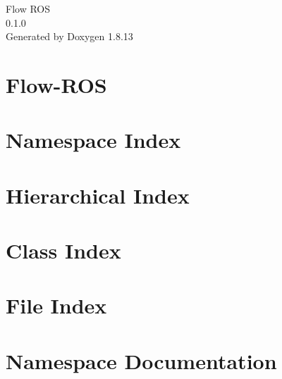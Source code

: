 \documentclass[twoside]{book}
\newcommand{\+}{\discretionary{\mbox{\scriptsize$\hookleftarrow$}}{}{}}
\newcommand{\clearemptydoublepage}{%
  \newpage{\pagestyle{empty}\cleardoublepage}%
}
\begin{document}
\hypersetup{pageanchor=false,
             bookmarksnumbered=true,
             pdfencoding=unicode
            }
\begin{titlepage}
\vspace*{7cm}
\begin{center}%
{\Large Flow R\+OS \\[1ex]\large 0.\+1.\+0 }\\
\vspace*{1cm}
{\large Generated by Doxygen 1.8.13}\\
\end{center}
\end{titlepage}
\clearemptydoublepage
{}
\tableofcontents
\clearemptydoublepage
{}
\hypersetup{pageanchor=true}

\chapter{Flow-\/\+R\+OS}
\label{index}\hypertarget{index}{}
\chapter{Namespace Index}

\chapter{Hierarchical Index}

\chapter{Class Index}

\chapter{File Index}

\chapter{Namespace Documentation}

\end{document}

